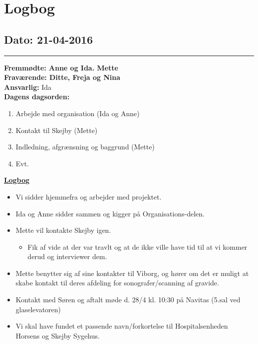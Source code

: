 \chapter{Logbog}
\section{Dato: 21-04-2016}
\hrule
\textbf{Fremmødte: Anne og Ida. Mette} \\
\textbf{Fraværende: Ditte, Freja og Nina } \\
\textbf{Ansvarlig: }Ida  \\
\textbf{Dagens dagsorden: }
\begin{enumerate}
	\item Arbejde med organisation (Ida og Anne)
	\item Kontakt til Skejby (Mette)
	\item Indledning, afgrænsning og baggrund (Mette)
	\item Evt. 
\end{enumerate}


\underline{\textbf{Logbog}}
\begin{itemize}
\item Vi sidder hjemmefra og arbejder med projektet.
\item Ida og Anne sidder sammen og kigger på Organisations-delen.
\item Mette vil kontakte Skejby igen.
\begin{itemize}
\item Fik af vide at der var travlt og at de ikke ville have tid til at vi kommer derud og interviewer dem.
\end{itemize}
\item Mette benytter sig af sine kontakter til Viborg, og hører om det er muligt at skabe kontakt til deres afdeling for sonografer/scanning af gravide.
\item Kontakt med Søren og aftalt møde d. 28/4 kl. 10:30 på Navitas (5.sal ved glaselevatoren)
\item Vi skal have fundet et passende navn/forkortelse til Hospitalsenheden Horsens og Skejby Sygehus.
\end{itemize}
